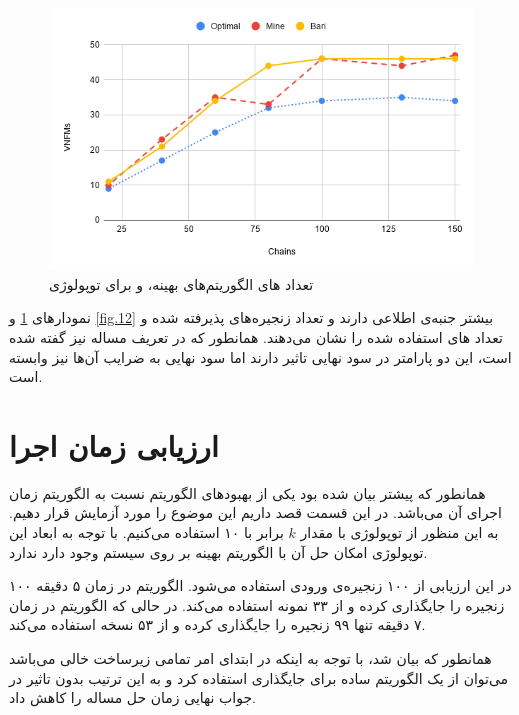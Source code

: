 \begin{figure}[h!]
\center\includegraphics[scale=.5]{images/chart-8}
\caption{تعداد های الگوریتم‌های بهینه،  و  برای توپولوژی }
\label{fig.13}
\end{figure}

نمودارهای \ref{fig.13} و \ref{fig.12}
بیشتر جنبه‌ی اطلاعی دارند و تعداد زنجیره‌های پذیرفته شده و تعداد
های
استفاده شده را نشان می‌دهند.
همانطور که در تعریف مساله نیز گفته شده است، این دو پارامتر در سود نهایی تاثیر دارند
اما سود نهایی به ضرایب آن‌ها نیز وابسته است.

\section{ارزیابی زمان اجرا}

همانطور که پیشتر بیان شده بود یکی از بهبودهای الگوریتم  نسبت به
الگوریتم 
زمان اجرای آن می‌باشد.
در این قسمت قصد داریم این موضوع را مورد آزمایش قرار دهیم.
به این منظور از توپولوژی  با مقدار \(k\) برابر با ۱۰ استفاده می‌کنیم.
با توجه به ابعاد این توپولوژی امکان حل آن با الگوریتم بهینه بر روی سیستم  وجود دارد ندارد.

در این ارزیابی از ۱۰۰ زنجیره‌ی ورودی استفاده می‌شود. الگوریتم 
در زمان ۵ دقیقه ۱۰۰ زنجیره را جایگذاری کرده و از ۳۳ نمونه
استفاده می‌کند. در حالی که الگوریتم 
در زمان ۷ دقیقه تنها ۹۹ زنجیره را جایگذاری کرده و از ۵۳ نسخه
استفاده می‌کند.

همانطور که بیان شد، با توجه به اینکه در ابتدای امر تمامی زیرساخت خالی می‌باشد
می‌توان از یک الگوریتم ساده برای جایگذاری استفاده کرد و به این ترتیب
بدون تاثیر در جواب نهایی زمان حل مساله را کاهش داد.

